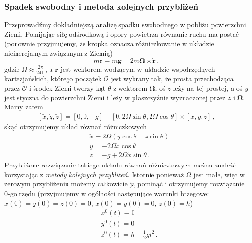 \documentclass[../main.tex]{subfiles}
\begin{document}
\subsubsection*{Spadek swobodny i metoda kolejnych przybliżeń}
Przeprowadźmy dokładniejszą analizę spadku swobodnego w pobliżu powierzchni Ziemi. Pomijając siłę
odśrodkową i opory powietrza równanie ruchu ma postać (ponownie przyjmujemy, że kropka oznacza
różniczkowanie w układzie nieinercjalnym związanym z Ziemią)
\begin{equation*}
    m\ddot{\mathbf{r}}=m\mathbf{g}-2m\boldsymbol{\Omega}\times\dot{\mathbf{r}}\,,
\end{equation*}
gdzie \(\Omega\approx\frac{2\pi}{24\,\text{h}}\), a \(\mathbf{r}\) jest wektorem wodzącym w układzie
współrzędnych kartezjańskich, którego początek \(\mathcal{O}\) jest wybrany tak, że prosta
przechodząca przez \(\mathcal{O}\) i środek Ziemi tworzy kąt \(\theta\) z wektorem
\(\boldsymbol{\Omega}\), oś \(z\) leży na tej prostej, a oś \(y\) jest styczna do powierzchni Ziemi
i leży w płaszczyźnie wyznaczonej przez \(z\) i \(\boldsymbol{\Omega}\). Mamy zatem
\begin{equation*}
    \begin{split}
        [\ddot x,\ddot y, \ddot{z}]=[0,0,-g]-[0,2\Omega\sin\theta,2\Omega\cos\theta]\times[\dot x,\dot y, \dot z]\,,
    \end{split}
\end{equation*}
skąd otrzymujemy układ równań różniczkowych
\begin{equation*}
    \begin{split}
        &\ddot x=2\Omega(\dot y\cos\theta-\dot z\sin\theta)\\
        &\ddot y=-2\Omega \dot x\cos\theta\\
        &\ddot z=-g+2\Omega\dot x\sin\theta\,.
    \end{split}
\end{equation*}
Przybliżone rozwiązanie takiego układu równań różniczkowych można znaleźć korzystając z
\textit{metody kolejnych przybliżeń}. Istotnie ponieważ \(\Omega\) jest małe, więc w zerowym
przybliżeniu możemy całkowicie ją pominąć i otrzymujemy rozwiązanie 0-go rzędu (przyjmujemy w
ogólności następujące warunki brzegowe: \(\dot x(0)=\dot y(0)=\dot z(0)=0\), \(x(0)=y(0)=0\),
\(z(0)=h\))
\begin{equation*}
    \begin{split}
        &x^{0}(t)=0\\
        &y^{0}(t)=0\\
        &z^{0}(t)=h-\frac{1}{2}gt^2\,.
    \end{split}
\end{equation*}
\end{document}
